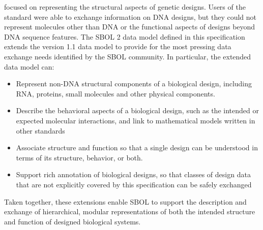  focused on representing the structural aspects of genetic designs. Users of the standard were able to exchange information on DNA designs, but they could not represent molecules other than DNA or the functional aspects of designs beyond DNA sequence features. The SBOL 2 data model defined in this specification extends the version 1.1 data model to provide for the most pressing data exchange needs identified by the SBOL community. In particular, the extended data model can:
\begin{itemize}

\item Represent non-DNA structural components of a biological design, including RNA, proteins, small molecules and other physical components.

\item Describe the behavioral aspects of a biological design, such as the intended or expected molecular interactions, and link to mathematical models written in other standards

\item Associate structure and function so that a single design can be understood in terms of its structure, behavior, or both.

\item Support rich annotation of biological designs, so that classes of design data that are not explicitly covered by this specification can be safely exchanged

\end{itemize}
Taken together, these extensions enable SBOL to support the description and exchange of hierarchical, modular representations of both the intended structure and function of designed biological systems.

